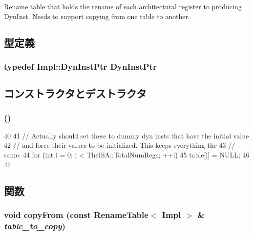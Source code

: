 Rename table that holds the rename of each architectural register to producing DynInst. Needs to support copying from one table to another. 

\subsection{型定義}
\hypertarget{classRenameTable_a028ce10889c5f6450239d9e9a7347976}{
\subsubsection[{DynInstPtr}]{\setlength{\rightskip}{0pt plus 5cm}typedef Impl::DynInstPtr {\bf DynInstPtr}}}
\label{classRenameTable_a028ce10889c5f6450239d9e9a7347976}


\subsection{コンストラクタとデストラクタ}
\hypertarget{classRenameTable_a01ad4b6bd6eae3d2962be56e3ac11273}{
\subsubsection[{RenameTable}]{ ()}}
\label{classRenameTable_a01ad4b6bd6eae3d2962be56e3ac11273}



\begin{DoxyCode}
40 {
41     // Actually should set these to dummy dyn insts that have the initial value
42     // and force their values to be initialized.  This keeps everything the
43     // same.
44     for (int i = 0; i < TheISA::TotalNumRegs; ++i) {
45         table[i] = NULL;
46     }
47 }
\end{DoxyCode}


\subsection{関数}
\hypertarget{classRenameTable_af3b6a44848d0b403df2362b4ea58c41e}{
\subsubsection[{copyFrom}]{\setlength{\rightskip}{0pt plus 5cm}void copyFrom (const {\bf RenameTable}$<$ Impl $>$ \& {\em table\_\-to\_\-copy})}}
\label{classRenameTable_af3b6a44848d0b403df2362b4ea58c41e}



